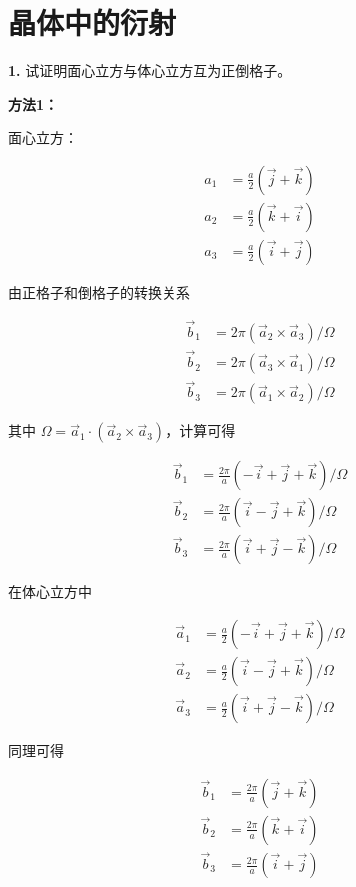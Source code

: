 \chapter{晶体中的衍射\label{ch:2}}

\noindent \textbf{1.\quad} 试证明面心立方与体心立方互为正倒格子。

\noindent \textbf{方法1：}

面心立方：

\begin{align*}
    a_1 &= \frac{a}{2} (\vec{j}+\vec{k}) \\
    a_2 &= \frac{a}{2} (\vec{k}+\vec{i}) \\
    a_3 &= \frac{a}{2} (\vec{i}+\vec{j})
\end{align*}

由正格子和倒格子的转换关系

\begin{align*}
    \vec{b}_1 &= 2\pi (\vec{a}_2 \times \vec{a}_3) / \Omega \\
    \vec{b}_2 &= 2\pi (\vec{a}_3 \times \vec{a}_1) / \Omega \\
    \vec{b}_3 &= 2\pi (\vec{a}_1 \times \vec{a}_2) / \Omega
\end{align*}

其中 $\Omega=\vec{a}_1 \cdot (\vec{a}_2 \times \vec{a}_3)$，计算可得

\begin{align*}
    \vec{b}_1 &= \frac{2\pi}{a} (-\vec{i}+\vec{j}+\vec{k}) / \Omega \\
    \vec{b}_2 &= \frac{2\pi}{a} (\vec{i}-\vec{j}+\vec{k}) / \Omega \\
    \vec{b}_3 &= \frac{2\pi}{a} (\vec{i}+\vec{j}-\vec{k}) / \Omega
\end{align*}

在体心立方中

\begin{align*}
    \vec{a}_1 &= \frac{a}{2} (-\vec{i}+\vec{j}+\vec{k}) / \Omega \\
    \vec{a}_2 &= \frac{a}{2} (\vec{i}-\vec{j}+\vec{k}) / \Omega \\
    \vec{a}_3 &= \frac{a}{2} (\vec{i}+\vec{j}-\vec{k}) / \Omega
\end{align*}

同理可得

\begin{align*}
    \vec{b}_1 &= \frac{2\pi}{a} (\vec{j}+\vec{k}) \\
    \vec{b}_2 &= \frac{2\pi}{a} (\vec{k}+\vec{i}) \\
    \vec{b}_3 &= \frac{2\pi}{a} (\vec{i}+\vec{j})
\end{align*}

